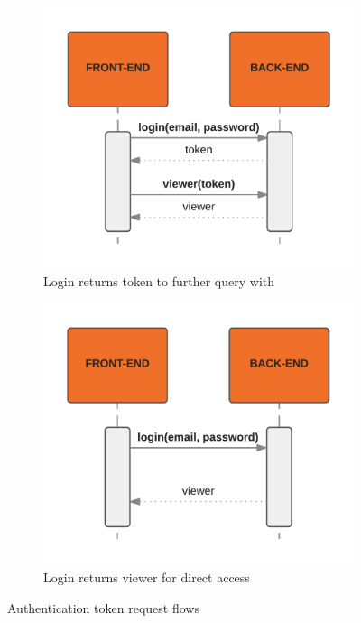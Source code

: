 \begin{figure}
    \centering
    \begin{subfigure}[b]{0.45\textwidth}
        \includegraphics[width=\textwidth]{graphics/loginSequence1}
        \caption{Login returns token to further query with}
        \label{fig:loginSequence1}
    \end{subfigure}
    \hfill
    \begin{subfigure}[b]{0.45\textwidth}
        \includegraphics[width=\textwidth]{graphics/loginSequence2}
        \caption{Login returns viewer for direct access}
        \label{fig:loginSequence2}
    \end{subfigure}
    \caption{Authentication token request flows}
\end{figure}

